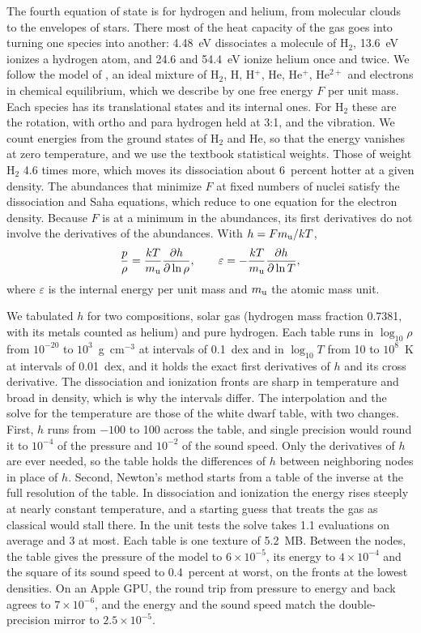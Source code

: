 \documentclass[twocolumn]{aastex701}
\begin{document}
The fourth equation of state is for hydrogen and helium, from molecular clouds to the envelopes of stars. There most of the heat capacity of the gas goes into turning one species into another: 4.48~eV dissociates a molecule of H$_2$, 13.6~eV ionizes a hydrogen atom, and 24.6 and 54.4~eV ionize helium once and twice. We follow the model of \citet{Tomida2013}, an ideal mixture of H$_2$, H, H$^+$, He, He$^+$, He$^{2+}$ and electrons in chemical equilibrium, which we describe by one free energy $F$ per unit mass. Each species has its translational states and its internal ones. For H$_2$ these are the rotation, with ortho and para hydrogen held at 3:1, and the vibration. We count energies from the ground states of H$_2$ and He, so that the energy vanishes at zero temperature, and we use the textbook statistical weights. Those of \citet{Tomida2013} weight H$_2$ 4.6 times more, which moves its dissociation about 6~percent hotter at a given density. The abundances that minimize $F$ at fixed numbers of nuclei satisfy the dissociation and Saha equations, which reduce to one equation for the electron density. Because $F$ is at a minimum in the abundances, its first derivatives do not involve the derivatives of the abundances. With $h = F m_{\rm u}/kT$,
\begin{equation*}
\frac{p}{\rho} = \frac{kT}{m_{\rm u}}\frac{\partial h}{\partial\ln\rho},\qquad \varepsilon = -\frac{kT}{m_{\rm u}}\frac{\partial h}{\partial\ln T},
\end{equation*}
where $\varepsilon$ is the internal energy per unit mass and $m_{\rm u}$ the atomic mass unit.

We tabulated $h$ for two compositions, solar gas (hydrogen mass fraction 0.7381, with its metals counted as helium) and pure hydrogen. Each table runs in $\log_{10}\rho$ from $10^{-20}$ to $10^3$~g~cm$^{-3}$ at intervals of 0.1~dex and in $\log_{10}T$ from 10 to $10^8$~K at intervals of 0.01~dex, and it holds the exact first derivatives of $h$ and its cross derivative. The dissociation and ionization fronts are sharp in temperature and broad in density, which is why the intervals differ. The interpolation and the solve for the temperature are those of the white dwarf table, with two changes. First, $h$ runs from $-100$ to 100 across the table, and single precision would round it to $10^{-4}$ of the pressure and $10^{-2}$ of the sound speed. Only the derivatives of $h$ are ever needed, so the table holds the differences of $h$ between neighboring nodes in place of $h$. Second, Newton's method starts from a table of the inverse at the full resolution of the table. In dissociation and ionization the energy rises steeply at nearly constant temperature, and a starting guess that treats the gas as classical would stall there. In the unit tests the solve takes 1.1 evaluations on average and 3 at most. Each table is one texture of 5.2~MB. Between the nodes, the table gives the pressure of the model to $6\times10^{-5}$, its energy to $4\times10^{-4}$ and the square of its sound speed to 0.4~percent at worst, on the fronts at the lowest densities. On an Apple GPU, the round trip from pressure to energy and back agrees to $7\times10^{-6}$, and the energy and the sound speed match the double-precision mirror to $2.5\times10^{-5}$.
\end{document}
